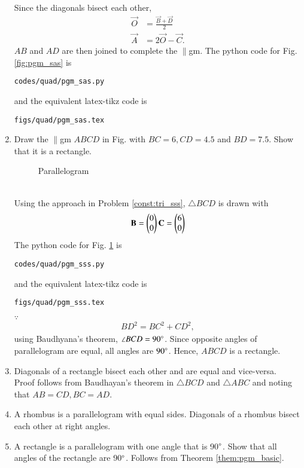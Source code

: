 \begin{enumerate}[label=\arabic*.,ref=\thesubsection.\theenumi]
\begin{align}
\end{align}
%
Since the diagonals bisect each other, 
%
\begin{align}
\vec{O} &= \frac{\vec{B}+\vec{D}}{2}
\\
\vec{A} &= 2\vec{O} - \vec{C}.
\end{align}
%
$AB$ and $AD$ are then joined to complete the $\parallel$gm.
The python code for  Fig. \ref{fig:pgm_sas} is
\begin{lstlisting}
codes/quad/pgm_sas.py
\end{lstlisting}
%
and the equivalent latex-tikz code is
%
\begin{lstlisting}
figs/quad/pgm_sas.tex
\end{lstlisting}
%
\item Draw the $\parallel$gm $ABCD$ in 	Fig. \label{fig:pgm_sss}	
with $BC = 6, CD = 4.5$ and $BD=7.5$.  Show that it is a rectangle.
%
\begin{figure}[!ht]
	\begin{center}
		\resizebox{\columnwidth}{!}{}
	\end{center}
	\caption{Parallelogram}
	\label{fig:pgm_sss}	
\end{figure}
\\
\solution Using the approach in Problem \ref{const:tri_sss}, $\triangle BCD$ is drawn with
%
\begin{align}
\mathbf{B} = \begin{pmatrix}0\\0\end{pmatrix}
\mathbf{C} = \begin{pmatrix}6\\0\end{pmatrix}
\end{align}
%
The python code for  Fig. \ref{fig:pgm_sss} is
\begin{lstlisting}
codes/quad/pgm_sss.py
\end{lstlisting}
%
and the equivalent latex-tikz code is
%
\begin{lstlisting}
figs/quad/pgm_sss.tex
\end{lstlisting}
%
$\because $
%
\begin{align}
BD^2 = BC^2+CD^2,
\end{align}
using Baudhyana's theorem, $\angle BCD =90\degree$. Since opposite angles  of parallelogram are equal, all angles are $90\degree$.  Hence, $ABCD$ is a rectangle. 
\item  Diagonals of a rectangle bisect each other and are equal and vice-versa. 
\\
\solution Proof follows from Baudhayan's theorem in $\triangle BCD$ and $\triangle ABC$ and noting that $AB = CD, BC = AD$.
\item A rhombus is a parallelogram with equal sides.  Diagonals of a rhombus bisect each other at right angles.
%
\\
\solution 
\item A rectangle is a parallelogram with one angle that is 90$\degree$.  Show that all angles of the rectangle are 90$\degree$.
\solution Follows from Theorem \ref{them:pgm_basic}.


\end{enumerate}
